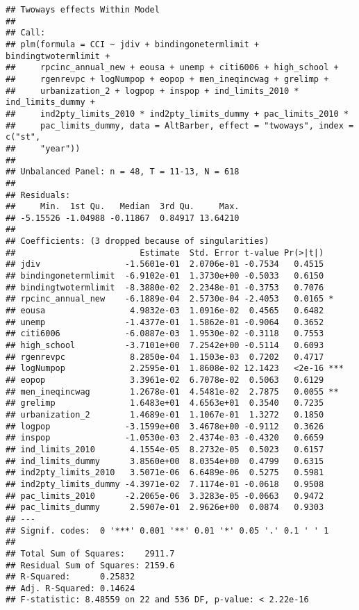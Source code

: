 \documentclass[]{article}
\begin{document}
\begin{verbatim}
## Twoways effects Within Model
## 
## Call:
## plm(formula = CCI ~ jdiv + bindingonetermlimit + bindingtwotermlimit + 
##     rpcinc_annual_new + eousa + unemp + citi6006 + high_school + 
##     rgenrevpc + logNumpop + eopop + men_ineqincwag + grelimp + 
##     urbanization_2 + logpop + inspop + ind_limits_2010 * ind_limits_dummy + 
##     ind2pty_limits_2010 * ind2pty_limits_dummy + pac_limits_2010 * 
##     pac_limits_dummy, data = AltBarber, effect = "twoways", index = c("st", 
##     "year"))
## 
## Unbalanced Panel: n = 48, T = 11-13, N = 618
## 
## Residuals:
##     Min.  1st Qu.   Median  3rd Qu.     Max. 
## -5.15526 -1.04988 -0.11867  0.84917 13.64210 
## 
## Coefficients: (3 dropped because of singularities)
##                         Estimate  Std. Error t-value Pr(>|t|)    
## jdiv                 -1.5601e-01  2.0706e-01 -0.7534   0.4515    
## bindingonetermlimit  -6.9102e-01  1.3730e+00 -0.5033   0.6150    
## bindingtwotermlimit  -8.3880e-02  2.2348e-01 -0.3753   0.7076    
## rpcinc_annual_new    -6.1889e-04  2.5730e-04 -2.4053   0.0165 *  
## eousa                 4.9832e-03  1.0916e-02  0.4565   0.6482    
## unemp                -1.4377e-01  1.5862e-01 -0.9064   0.3652    
## citi6006             -6.0887e-03  1.9530e-02 -0.3118   0.7553    
## high_school          -3.7101e+00  7.2542e+00 -0.5114   0.6093    
## rgenrevpc             8.2850e-04  1.1503e-03  0.7202   0.4717    
## logNumpop             2.2595e-01  1.8608e-02 12.1423   <2e-16 ***
## eopop                 3.3961e-02  6.7078e-02  0.5063   0.6129    
## men_ineqincwag        1.2678e-01  4.5481e-02  2.7875   0.0055 ** 
## grelimp               1.6483e+01  4.6563e+01  0.3540   0.7235    
## urbanization_2        1.4689e-01  1.1067e-01  1.3272   0.1850    
## logpop               -3.1599e+00  3.4678e+00 -0.9112   0.3626    
## inspop               -1.0530e-03  2.4374e-03 -0.4320   0.6659    
## ind_limits_2010       4.1554e-05  8.2732e-05  0.5023   0.6157    
## ind_limits_dummy      3.8560e+00  8.0354e+00  0.4799   0.6315    
## ind2pty_limits_2010   3.5071e-06  6.6489e-06  0.5275   0.5981    
## ind2pty_limits_dummy -4.3971e-02  7.1174e-01 -0.0618   0.9508    
## pac_limits_2010      -2.2065e-06  3.3283e-05 -0.0663   0.9472    
## pac_limits_dummy      2.5907e-01  2.9626e+00  0.0874   0.9303    
## ---
## Signif. codes:  0 '***' 0.001 '**' 0.01 '*' 0.05 '.' 0.1 ' ' 1
## 
## Total Sum of Squares:    2911.7
## Residual Sum of Squares: 2159.6
## R-Squared:      0.25832
## Adj. R-Squared: 0.14624
## F-statistic: 8.48559 on 22 and 536 DF, p-value: < 2.22e-16
\end{verbatim}
\end{document}
